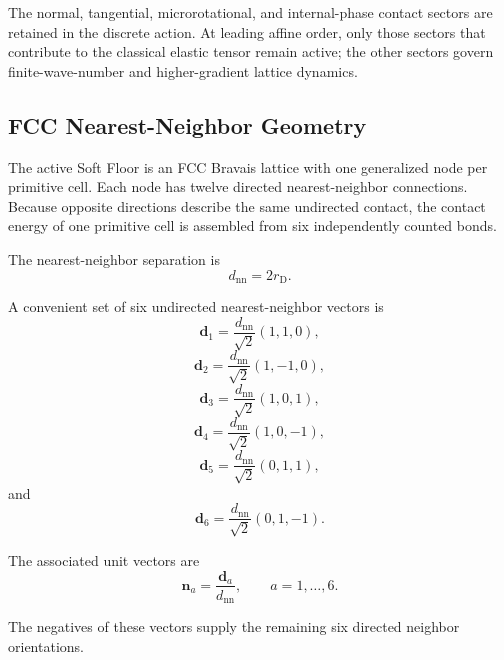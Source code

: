 The normal, tangential, microrotational, and internal-phase contact sectors are retained in the discrete action. At leading affine order, only those sectors that contribute to the classical elastic tensor remain active; the other sectors govern finite-wave-number and higher-gradient lattice dynamics.

\subsection{FCC Nearest-Neighbor Geometry}

The active Soft Floor is an FCC Bravais lattice with one generalized node per primitive cell. Each node has twelve directed nearest-neighbor connections. Because opposite directions describe the same undirected contact, the contact energy of one primitive cell is assembled from six independently counted bonds.

The nearest-neighbor separation is
\begin{equation}
    d_{\mathrm{nn}} = 2r_{\mathrm{D}}.
\end{equation}

A convenient set of six undirected nearest-neighbor vectors is
\begin{equation}
    \mathbf{d}_1 = \frac{d_{\mathrm{nn}}}{\sqrt{2}} (1,1,0),
\end{equation}
\begin{equation}
    \mathbf{d}_2 = \frac{d_{\mathrm{nn}}}{\sqrt{2}} (1,-1,0),
\end{equation}
\begin{equation}
    \mathbf{d}_3 = \frac{d_{\mathrm{nn}}}{\sqrt{2}} (1,0,1),
\end{equation}
\begin{equation}
    \mathbf{d}_4 = \frac{d_{\mathrm{nn}}}{\sqrt{2}} (1,0,-1),
\end{equation}
\begin{equation}
    \mathbf{d}_5 = \frac{d_{\mathrm{nn}}}{\sqrt{2}} (0,1,1),
\end{equation}
and
\begin{equation}
    \mathbf{d}_6 = \frac{d_{\mathrm{nn}}}{\sqrt{2}} (0,1,-1).
\end{equation}

The associated unit vectors are
\begin{equation}
    \hat{\mathbf{n}}_a = \frac{\mathbf{d}_a}{d_{\mathrm{nn}}}, \qquad a=1,\ldots,6.
\end{equation}

The negatives of these vectors supply the remaining six directed neighbor orientations.

